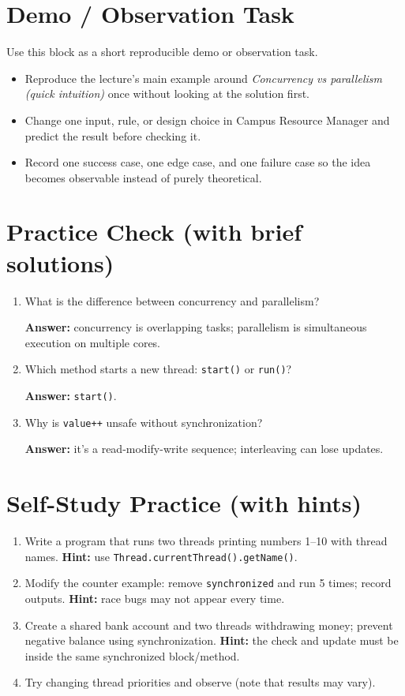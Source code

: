 \documentclass[11pt]{article}
\begin{document}
\section{Demo / Observation Task}
Use this block as a short reproducible demo or observation task.
\begin{itemize}
  \item Reproduce the lecture's main example around \textit{Concurrency vs parallelism (quick intuition)} once without looking at the solution first.
  \item Change one input, rule, or design choice in Campus Resource Manager and predict the result before checking it.
  \item Record one success case, one edge case, and one failure case so the idea becomes observable instead of purely theoretical.
\end{itemize}
\notesources{\OOPSUnitIIISources}

\section{Practice Check (with brief solutions)}
\begin{enumerate}
  \item What is the difference between concurrency and parallelism?\par
  \textbf{Answer:} concurrency is overlapping tasks; parallelism is simultaneous execution on multiple cores.

  \item Which method starts a new thread: \texttt{start()} or \texttt{run()}?\par
  \textbf{Answer:} \texttt{start()}.

  \item Why is \texttt{value++} unsafe without synchronization?\par
  \textbf{Answer:} it's a read-modify-write sequence; interleaving can lose updates.
\end{enumerate}

\section{Self-Study Practice (with hints)}
\begin{enumerate}
  \item Write a program that runs two threads printing numbers 1--10 with thread names.
  \textbf{Hint:} use \texttt{Thread.currentThread().getName()}.

  \item Modify the counter example: remove \texttt{synchronized} and run 5 times; record outputs.
  \textbf{Hint:} race bugs may not appear every time.

  \item Create a shared bank account and two threads withdrawing money; prevent negative balance using synchronization.
  \textbf{Hint:} the check and update must be inside the same synchronized block/method.

  \item Try changing thread priorities and observe (note that results may vary).
\end{enumerate}
\end{document}
